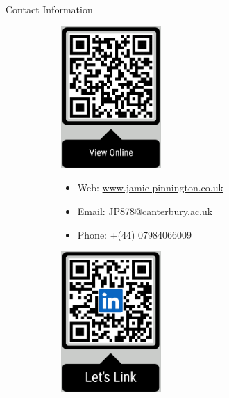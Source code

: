 \documentclass[xcolor={cmyk}]{beamer} %
\begin{document}
\begin{frame}[t]
\begin{columns}[t]
\begin{column}{0.3\textwidth}


			\begin{block}{Contact Information}
				\begin{figure}
					\begin{subfigure}[t]{0.25\linewidth}
						\centering
						\includegraphics[width=1.5in,valign=t]{qr_online_v6.png}
					\end{subfigure}
					\begin{subfigure}[t]{0.45\linewidth}
						\begin{itemize}
							\item Web: \href{https://www.jamie-pinnington.co.uk}{www.jamie-pinnington.co.uk}
							\item Email: \href{mailto:JP878@canterbury.ac.uk}{JP878@canterbury.ac.uk}
							\item Phone: +(44) 07984066009
						\end{itemize}
					\end{subfigure}
					\begin{subfigure}[t]{0.25\linewidth}
						\centering
						\includegraphics[width=1.5in,valign=t]{qr_linked_v5.png}
					\end{subfigure}
				\end{figure}
			\end{block}


\end{column}
\end{columns}
\end{frame}
\end{document}
